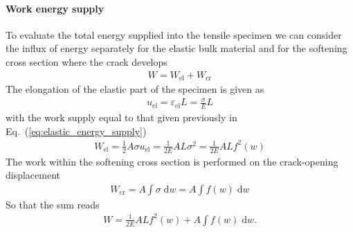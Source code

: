 \documentclass[main.tex]{subfiles}
\begin{document}
\paragraph{Work energy supply} To evaluate the total energy supplied into the tensile specimen we can consider the influx of energy separately for the elastic bulk material and for the softening cross section where the crack develops
\begin{align}
W = W_\mathrm{el} + W_\mathrm{cr}
\end{align}
The elongation of the elastic part of the specimen is given as
\begin{align}
u_\mathrm{el} = \varepsilon_\mathrm{el} L = \frac{\sigma}{E} L
\end{align}
with the work supply equal to that given previously in Eq.~(\ref{eq:elastic_energy_supply})
\begin{align}
W_\mathrm{el} = \frac{1}{2} A \sigma u_\mathrm{el}
=
\frac{1}{2E} A L \sigma^2
=
\frac{1}{2E} A L f^2(w)
\end{align}
The work within the softening cross section is performed on the crack-opening displacement
\begin{align}
W_\mathrm{cr}
= A \int \sigma \; \mathrm{d} w
= A \int f(w) \; \mathrm{d} w
\end{align}
So that the sum reads
\begin{align}
W = \frac{1}{2E} A L f^2(w) + A \int f(w) \; \mathrm{d} w.
\end{align}
\end{document}

